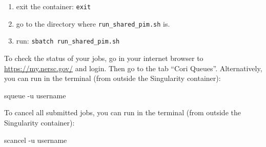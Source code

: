\documentclass[12pt]{article}
\begin{document}
\begin{enumerate}
\item exit the container: \verb|exit|
\item go to the directory where \verb|run_shared_pim.sh| is.
\item run: \verb|sbatch run_shared_pim.sh|
\end{enumerate}

To check the status of your jobs, go in your internet browser to \href{https://my.nersc.gov/}{https://my.nersc.gov/} and login.
Then go to the tab ``Cori Queues''.
Alternatively, you can run in the terminal (from outside the Singularity container):

\begin{tcolorbox}
\begin{verbnobox}[\scriptsize]
squeue -u username
\end{verbnobox}  
\end{tcolorbox}

To cancel all submitted jobs, you can run in the terminal (from outside the Singularity container):

\begin{tcolorbox}
\begin{verbnobox}[\scriptsize]
scancel -u username
\end{verbnobox}  
\end{tcolorbox}

%
%
\end{document}
